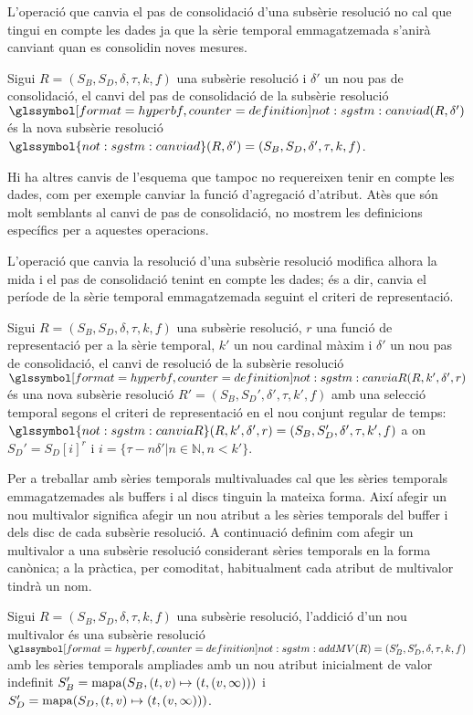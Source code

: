 L'operació que canvia el pas de consolidació d'una subsèrie resolució
no cal que tingui en compte les dades ja que la sèrie temporal
emmagatzemada s'anirà canviant quan es consolidin noves mesures.
\begin{definition}
  \label{def:sgstm:canviad}
  Sigui $R = (S_B,S_D,\delta,\tau,k,f)$ una subsèrie resolució i
  $\delta'$ un nou pas de consolidació, el canvi del pas de
  consolidació de la subsèrie resolució
  $\glssymboldef{not:sgstm:canviad}(R,\delta')$ és la nova subsèrie resolució
  $\glssymbol{not:sgstm:canviad}(R,\delta')=(S_B,S_D,\delta',\tau,k,f)$.
\end{definition}

Hi ha altres canvis de l'esquema que tampoc no requereixen tenir en
compte les dades, com per exemple canviar la funció d'agregació
d'atribut. Atès que són molt semblants al canvi de pas de
consolidació, no mostrem les definicions específics per a aquestes
operacions.


L'operació que canvia la resolució d'una subsèrie resolució modifica
alhora la mida i el pas de consolidació tenint en compte les dades; és
a dir, canvia el període de la sèrie temporal emmagatzemada seguint el
criteri de representació.
\begin{definition}
  Sigui $R = (S_B,S_D,\delta,\tau,k,f)$ una subsèrie resolució, $r$
  una funció de representació per a la sèrie temporal, $k'$ un nou
  cardinal màxim i $\delta'$ un nou pas de consolidació, el canvi de
  resolució de la subsèrie resolució
  $\glssymboldef{not:sgstm:canviaR}(R,k',\delta',r)$ és una nova subsèrie
  resolució $R' = (S_B,S_D',\delta',\tau,k',f)$ amb una selecció
  temporal segons el criteri de representació en el nou conjunt
  regular de temps:
  $\glssymbol{not:sgstm:canviaR}(R,k',\delta',r)=(S_B,S_D',\delta',\tau,k',f)$
  a on $S_D' = S_D[i]^r$ i $i=\{ \tau-n\delta' | n\in\mathbb{N},n<k'
  \}$.
\end{definition}


Per a treballar amb sèries temporals multivaluades cal que les sèries
temporals emmagatzemades als buffers i al discs tinguin la mateixa
forma. Així afegir un nou multivalor significa afegir un nou atribut a
les sèries temporals del buffer i dels disc de cada subsèrie
resolució. A continuació definim com afegir un multivalor a una
subsèrie resolució considerant sèries temporals en la forma canònica;
a la pràctica, per comoditat, habitualment cada atribut de multivalor
tindrà un nom.
\begin{definition}
  Sigui $R = (S_B,S_D,\delta,\tau,k,f)$ una subsèrie resolució,
  l'addició d'un nou multivalor és una subsèrie resolució
  $\glssymboldef{not:sgstm:addMV}(R) = (S_B',S_D',\delta,\tau,k,f)$ amb les
    sèries temporals ampliades amb un nou atribut inicialment de valor
    indefinit $S'_{B} = \operatorname*{mapa}(S_B,(t,v)\mapsto(t,(v,\infty)))$ i
    $S'_{D} = \operatorname*{mapa}(S_D,(t,v)\mapsto(t,(v,\infty)))$.
\end{definition}

